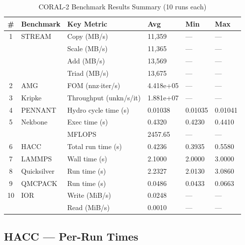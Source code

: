 \documentclass[12pt,a4paper]{article}
\begin{document}
\begin{table}[H]
\centering
\caption{CORAL-2 Benchmark Results Summary (10 runs each)}
\small
\begin{tabular}{clllll}
\toprule
\textbf{\#} & \textbf{Benchmark} & \textbf{Key Metric} & \textbf{Avg} & \textbf{Min} & \textbf{Max} \\
\midrule
1 & STREAM    & Copy (MB/s)           & 11,359         & ---    & --- \\
  &           & Scale (MB/s)          & 11,365         & ---    & --- \\
  &           & Add (MB/s)            & 13,569         & ---    & --- \\
  &           & Triad (MB/s)          & 13,675         & ---    & --- \\
\midrule
2 & AMG       & FOM (nnz$\cdot$iter/s)& 4.418e+05      & ---    & --- \\
\midrule
3 & Kripke    & Throughput (unkn/s/it)& 1.881e+07      & ---    & --- \\
\midrule
4 & PENNANT   & Hydro cycle time (s)  & 0.01038        & 0.01035 & 0.01041 \\
\midrule
5 & Nekbone   & Exec time (s)         & 0.4320         & 0.4230  & 0.4410 \\
  &           & MFLOPS                & 2457.65        & ---     & ---    \\
\midrule
6 & HACC      & Total run time (s)    & 0.4236         & 0.3935  & 0.5580 \\
\midrule
7 & LAMMPS    & Wall time (s)         & 2.1000         & 2.0000  & 3.0000 \\
\midrule
8 & Quicksilver & Run time (s)        & 2.2327         & 2.0130  & 3.0860 \\
\midrule
9 & QMCPACK   & Run time (s)          & 0.0486         & 0.0433  & 0.0663 \\
\midrule
10 & IOR      & Write (MiB/s)         & 0.0248         & ---     & ---    \\
   &          & Read (MiB/s)          & 0.0010         & ---     & ---    \\
\bottomrule
\end{tabular}
\end{table}

\subsection{HACC --- Per-Run Times}
\end{document}
